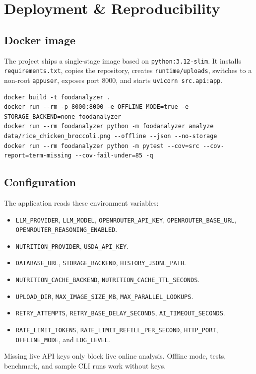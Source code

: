 \documentclass[11pt,a4paper]{article}
\begin{document}
\section{Deployment \& Reproducibility}\label{sec:deploy}

\subsection{Docker image}
The project ships a single-stage image based on \texttt{python:3.12-slim}. It installs \texttt{requirements.txt}, copies the repository, creates \texttt{runtime/uploads}, switches to a non-root \texttt{appuser}, exposes port 8000, and starts \texttt{uvicorn src.api:app}.

\begin{lstlisting}[style=bash]
docker build -t foodanalyzer .
docker run --rm -p 8000:8000 -e OFFLINE_MODE=true -e STORAGE_BACKEND=none foodanalyzer
docker run --rm foodanalyzer python -m foodanalyzer analyze data/rice_chicken_broccoli.png --offline --json --no-storage
docker run --rm foodanalyzer python -m pytest --cov=src --cov-report=term-missing --cov-fail-under=85 -q
\end{lstlisting}

\subsection{Configuration}
The application reads these environment variables:
\begin{itemize}[itemsep=2pt]
  \item \texttt{LLM\_PROVIDER}, \texttt{LLM\_MODEL}, \texttt{OPENROUTER\_API\_KEY}, \texttt{OPENROUTER\_BASE\_URL}, \texttt{OPENROUTER\_REASONING\_ENABLED}.
  \item \texttt{NUTRITION\_PROVIDER}, \texttt{USDA\_API\_KEY}.
  \item \texttt{DATABASE\_URL}, \texttt{STORAGE\_BACKEND}, \texttt{HISTORY\_JSONL\_PATH}.
  \item \texttt{NUTRITION\_CACHE\_BACKEND}, \texttt{NUTRITION\_CACHE\_TTL\_SECONDS}.
  \item \texttt{UPLOAD\_DIR}, \texttt{MAX\_IMAGE\_SIZE\_MB}, \texttt{MAX\_PARALLEL\_LOOKUPS}.
  \item \texttt{RETRY\_ATTEMPTS}, \texttt{RETRY\_BASE\_DELAY\_SECONDS}, \texttt{AI\_TIMEOUT\_SECONDS}.
  \item \texttt{RATE\_LIMIT\_TOKENS}, \texttt{RATE\_LIMIT\_REFILL\_PER\_SECOND}, \texttt{HTTP\_PORT}, \texttt{OFFLINE\_MODE}, and \texttt{LOG\_LEVEL}.
\end{itemize}
Missing live API keys only block live online analysis. Offline mode, tests, benchmark, and sample CLI runs work without keys.
\end{document}
